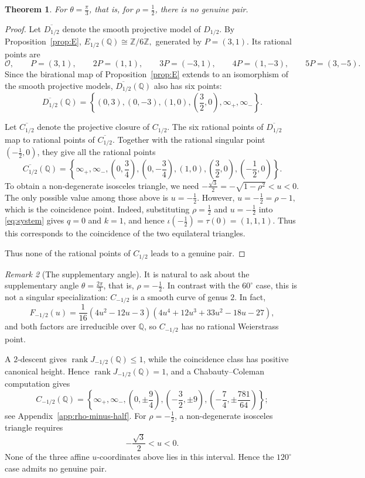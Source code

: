 \documentclass[11pt]{amsart}
\theoremstyle{plain}
\newtheorem{thm}{Theorem}[section]
\theoremstyle{remark}
\newtheorem{rem}[thm]{Remark}
\theoremstyle{plain}
\newcommand{\Q}{\mathbb{Q}}
\newcommand{\Z}{\mathbb{Z}}
\begin{document}
\begin{thm}\label{thm:60}
For $\theta=\frac{\pi}{3}$, that is, for $\rho=\frac12$, there is no
genuine pair.
\end{thm}

\begin{proof}
Let $\overline{D_{1/2}}$ denote the smooth projective model of $D_{1/2}$. By
Proposition~\ref{prop:E},
$E_{1/2}(\Q)\cong \Z/6\Z,$
generated by $P=(3,1)$. Its rational points are
\[
\mathcal O,\qquad
P=(3,1),\qquad
2P=(1,1),\qquad
3P=(-3,1),\qquad
4P=(1,-3),\qquad
5P=(3,-5).
\]
Since the birational map of Proposition~\ref{prop:E} extends to an
isomorphism of the smooth projective models, $\overline{D_{1/2}}(\Q)$
also has six points:
\[
\overline{D_{1/2}}(\Q)
=
\left\{
(0,3),(0,-3),(1,0),
\left(\frac32,0\right),
\infty_+,\infty_-
\right\}.
\]

Let $\overline{C_{1/2}}$ denote the projective closure of $C_{1/2}$.
The six rational points of $\overline{D_{1/2}}$ map to rational
points of $\overline{C_{1/2}}$. Together with the rational singular
point $\left(-\frac12,0\right)$, they give all the rational points
\[
\overline{C_{1/2}}(\Q)
=
\left\{
\infty_+,\infty_-,
\left(0,\frac34\right),
\left(0,-\frac34\right),
(1,0),
\left(\frac32,0\right),
\left(-\frac12,0\right)
\right\}.
\]
To obtain a non-degenerate isosceles triangle, we need
$-\frac{\sqrt{3}}{2}
=
-\sqrt{1-\rho^2}
<u<0.$
The only possible value among those above is $u=-\frac12$. However,
$
u=-\frac12=\rho-1,
$
which is the coincidence point. Indeed, substituting
$\rho=\frac12$ and $u=-\frac12$ into \eqref{eq:system} gives
$q=0$ and $k=1$, and hence
$\iota\left(-\frac12\right) = \tau(0) = (1,1,1)$.
Thus this corresponds to the coincidence of the two equilateral
triangles.

Thus none of the  rational points of $C_{1/2}$ leads to a genuine pair.
\end{proof}


\begin{rem}[The supplementary angle]\label{rem:120}
It is natural to ask about the supplementary angle
$\theta=\frac{2\pi}{3}$, that is, $\rho=-\frac12$. In contrast with
the $60^\circ$ case, this is not a singular specialization:
$C_{-1/2}$ is a smooth curve of genus $2$. In fact,
\[
F_{-1/2}(u)
=
\frac1{16}
(4u^2-12u-3)
(4u^4+12u^3+33u^2-18u-27),
\]
and both factors are irreducible over $\Q$, so $C_{-1/2}$ has no
rational Weierstrass point.

A $2$-descent gives
$\operatorname{rank}J_{-1/2}(\Q)\leq1$, while the coincidence class
has positive canonical height. Hence
$\operatorname{rank}J_{-1/2}(\Q)=1$, and a Chabauty--Coleman
computation gives
\[
C_{-1/2}(\Q)
=
\left\{
\infty_+,\infty_-,
\left(0,\pm\frac94\right),
\left(-\frac32,\pm9\right),
\left(-\frac74,\pm\frac{781}{64}\right)
\right\};
\]
see Appendix~\ref{app:rho-minus-half}. For $\rho=-\frac12$, a
non-degenerate isosceles triangle requires
\[
-\frac{\sqrt3}{2}<u<0.
\]
None of the three affine $u$-coordinates above lies in this interval.
Hence the $120^\circ$ case admits no genuine pair.
\end{rem}
\end{document}
